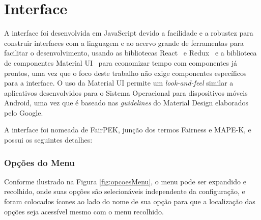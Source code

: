\documentclass[portugues]{ic-tese}
\begin{document}
\section{Interface}
\label{sec:interface}

A interface foi desenvolvida em JavaScript devido a facilidade e a robustez para construir interfaces com a linguagem e ao acervo grande de ferramentas para facilitar o desenvolvimento, usando as bibliotecas React~\citep{React_2023} e Redux~\citep{Redux_2023} e a biblioteca de componentes Material UI~\citep{MaterialUI_2023} para economizar tempo com componentes já prontos, uma vez que o foco deste trabalho não exige componentes específicos para a interface. O uso da Material UI permite um \textit{look-and-feel} similar a aplicativos desenvolvidos para o Sistema Operacional para dispositivos móveis Android, uma vez que é baseado nas \textit{guidelines} do Material Design elaborados pelo Google.

A interface foi nomeada de FairPEK, junção dos termos Fairness e MAPE-K, e possui os seguintes detalhes:

\subsubsection{Opções do Menu}

Conforme ilustrado na Figura \ref{fig:opcoesMenu}, o menu pode ser expandido e recolhido, onde suas opções são selecionáveis independente da configuração, e foram colocados ícones ao lado do nome de sua opção para que a localização das opções seja acessível mesmo com o menu recolhido.
\end{document}
